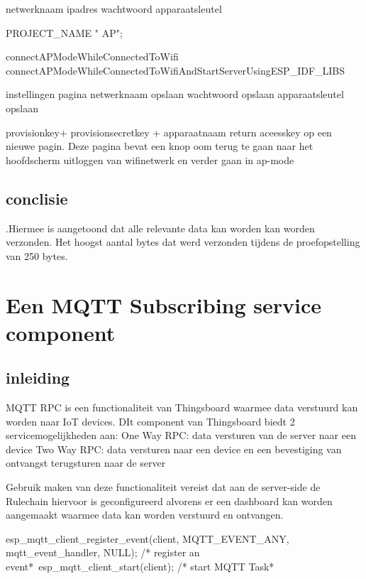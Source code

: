 		netwerknaam
		ipadres
		wachtwoord
		apparaatsleutel
		
		PROJECT_NAME " AP";
		
		connectAPModeWhileConnectedToWifi
		connectAPModeWhileConnectedToWifiAndStartServerUsingESP_IDF_LIBS
		
		
		
		instellingen pagina
		netwerknaam opslaan
		wachtwoord opslaan
		apparaatsleutel opslaan
		
		
		provisionkey+ provisionsecretkey + apparaatnaam return aceesskey op een nieuwe pagin. Deze pagina bevat een knop oom terug te gaan naar het hoofdscherm
		uitloggen van wifinetwerk en verder gaan in ap-mode
		
		
		\subsection{conclisie}
		.Hiermee is aangetoond dat alle relevante data kan worden kan worden verzonden. Het hoogst aantal bytes dat werd verzonden tijdens de proefopstelling van 250 bytes.
		
		\begin{center}
		\end{center}
		
		\section{Een MQTT Subscribing service component}
		
		\subsection{inleiding}
		
		MQTT RPC is een functionaliteit van Thingsboard waarmee data verstuurd kan worden naar IoT devices. DIt component van Thingsboard biedt 2 servicemogelijkheden aan:
		One Way RPC: data versturen van de server naar een device
		Two Way RPC: data versturen naar een device en een bevestiging van ontvangst terugsturen naar de server
		
		Gebruik maken van deze functionaliteit vereist dat aan de server-side de Rulechain hiervoor is geconfigureerd alvorens er een dashboard kan worden aangemaakt waarmee data kan worden verstuurd en ontvangen.
		
		
		esp_mqtt_client_register_event(client, MQTT_EVENT_ANY, mqtt_event_handler, NULL); /* register an event*\
		esp_mqtt_client_start(client);  /* start MQTT Task*\
		
